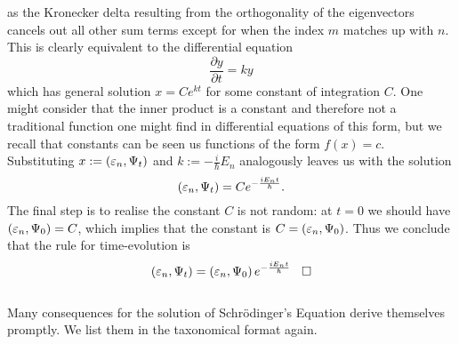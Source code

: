 as the Kronecker delta resulting from the orthogonality of the eigenvectors cancels out all other sum terms except for when the index $m$ matches up with $n$. This is clearly equivalent to the differential equation
$$
\frac{\partial y}{\partial t}=ky
$$
which has general solution $x=Ce^{kt}$ for some constant of integration $C$. One might consider that the inner product is a constant and therefore not a traditional function one might find in differential equations of this form, but we recall that constants can be seen us functions of the form $f(x)=c$. Substituting $x:=\left(\varepsilon_{n},\Psi_{t}\right)$ and $k:=-\frac{i}{\hbar}E_{n}$ analogously leaves us with the solution
$$
\left(\varepsilon_{n},\Psi_{t}\right)=Ce^{-\frac{iE_{n}t}{\hbar}}.
$$
The final step is to realise the constant $C$ is not random: at $t=0$ we should have $\left(\varepsilon_{n},\Psi_{0}\right)=C$, which implies that the constant is $C=\left(\varepsilon_{n},\Psi_{0}\right)$. Thus we conclude that the rule for time-evolution is 
$$
\left(\varepsilon_{n},\Psi_{t}\right)=\left(\varepsilon_{n},\Psi_{0}\right)e^{-\frac{iE_{n}t}{\hbar}} \:\:\:\:\square
$$
\\
Many consequences for the solution of Schr\"{o}dinger's Equation derive themselves promptly. We list them in the taxonomical format again.
\\
